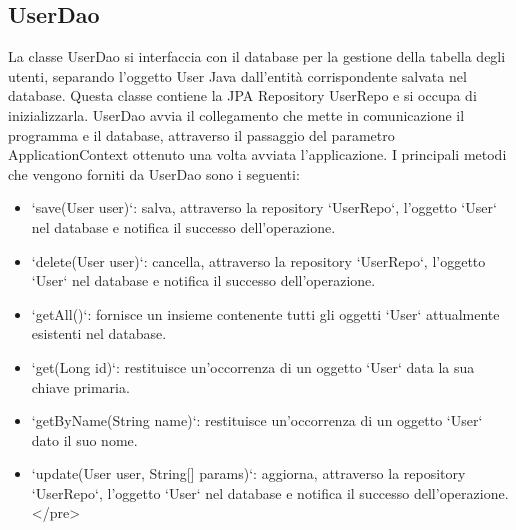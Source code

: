 \documentclass[twoside,openright,titlepage,fleqn,headinclude,12pt,a4paper,BCOR=5mm,footinclude]{scrbook}
\begin{document}
\subsection{UserDao}
La classe UserDao si interfaccia con il database per la gestione della tabella degli utenti, separando l'oggetto User Java dall'entità corrispondente salvata nel database. Questa classe contiene la JPA Repository UserRepo e si occupa di inizializzarla. UserDao avvia il collegamento che mette in comunicazione il programma e il database, attraverso il passaggio del parametro ApplicationContext ottenuto una volta avviata l'applicazione. I principali metodi che vengono forniti da UserDao sono i seguenti:  \begin{itemize} 
    \item `save(User user)`: salva, attraverso la repository `UserRepo`, l'oggetto `User` nel database e notifica il successo dell'operazione. 
    \item `delete(User user)`: cancella, attraverso la repository `UserRepo`, l'oggetto `User` nel database e notifica il successo dell'operazione. 
    \item `getAll()`: fornisce un insieme contenente tutti gli oggetti `User` attualmente esistenti nel database. 
    \item `get(Long id)`: restituisce un'occorrenza di un oggetto `User` data la sua chiave primaria. 
    \item `getByName(String name)`: restituisce un'occorrenza di un oggetto `User` dato il suo nome. 
    \item `update(User user, String[] params)`: aggiorna, attraverso la repository `UserRepo`, l'oggetto `User` nel database e notifica il successo dell'operazione. </pre> 
\end{itemize}
\end{document}
